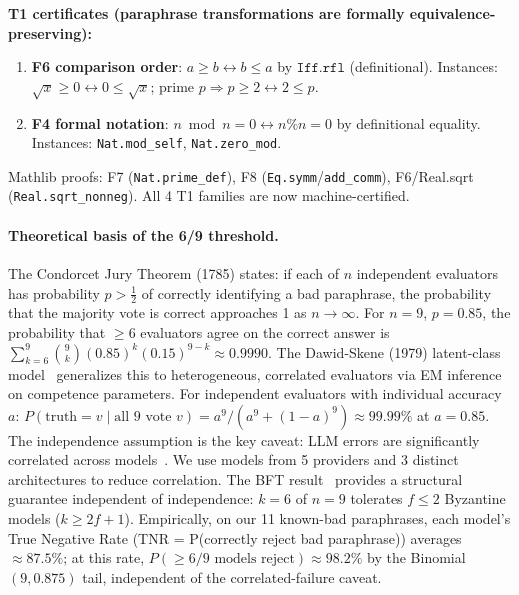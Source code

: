 \documentclass{article}
\begin{document}
\textbf{T1 certificates (paraphrase transformations are formally equivalence-preserving):}
\begin{enumerate}[leftmargin=*,itemsep=2pt]
\item \textbf{F6 comparison order}: $a \geq b \leftrightarrow b \leq a$ by $\mathtt{Iff.rfl}$ (definitional).
  Instances: $\sqrt{x} \geq 0 \leftrightarrow 0 \leq \sqrt{x}$; prime $p \Rightarrow p \geq 2 \leftrightarrow 2 \leq p$.

\item \textbf{F4 formal notation}: $n \bmod n = 0 \leftrightarrow n\%n = 0$ by definitional equality.
  Instances: \texttt{Nat.mod\_self}, \texttt{Nat.zero\_mod}.
\end{enumerate}

Mathlib proofs: F7 (\texttt{Nat.prime\_def}), F8 (\texttt{Eq.symm}/\texttt{add\_comm}), F6/Real.sqrt (\texttt{Real.sqrt\_nonneg}). All 4 T1 families are now machine-certified.

\paragraph{Theoretical basis of the 6/9 threshold.}
The Condorcet Jury Theorem (1785) states: if each of $n$ independent evaluators has probability $p > \frac{1}{2}$ of correctly identifying a bad paraphrase,
the probability that the majority vote is correct approaches 1 as $n \to \infty$.
For $n = 9$, $p = 0.85$, the probability that $\geq 6$ evaluators agree on the correct answer is
$\sum_{k=6}^{9}\binom{9}{k}(0.85)^k(0.15)^{9-k} \approx 0.9990$.
The Dawid-Skene (1979) latent-class model~\citep{dawid1979} generalizes this to heterogeneous, correlated evaluators via EM inference on competence parameters.
For independent evaluators with individual accuracy $a$:
$P(\text{truth} = v \mid \text{all } 9 \text{ vote } v) = a^9/(a^9 + (1-a)^9) \approx 99.99\%$ at $a = 0.85$.
The independence assumption is the key caveat: LLM errors are significantly correlated across models~\citep{kim2025llmcorr}.
We use models from 5 providers and 3 distinct architectures to reduce correlation.
The BFT result~\citep{lamport1982byzantine} provides a structural guarantee independent of independence: $k=6$ of $n=9$ tolerates $f \leq 2$ Byzantine models ($k \geq 2f+1$).
Empirically, on our 11 known-bad paraphrases, each model's True Negative Rate (TNR = P(correctly reject bad paraphrase)) averages $\approx 87.5\%$; at this rate, $P(\geq 6/9 \text{ models reject}) \approx 98.2\%$ by the Binomial$(9, 0.875)$ tail, independent of the correlated-failure caveat.
\end{document}
